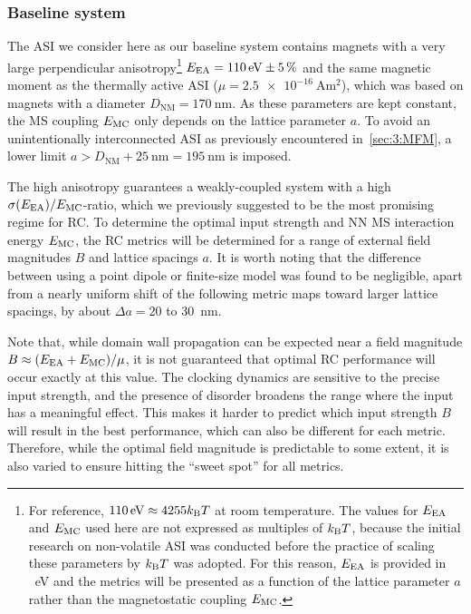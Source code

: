 \subsubsection{Baseline system}
The ASI we consider here as our baseline system contains magnets with a very large perpendicular anisotropy\footnote{
	For reference, $\SI{110}{\electronvolt} \approx 4255\kBT$ at room temperature.
	The values for $E_\mathrm{EA}$ and $E_\mathrm{MC}$ used here are not expressed as multiples of $\kBT$, because the initial research on non-volatile ASI was conducted before the practice of scaling these parameters by $\kBT$ was adopted.
	For this reason, $E_\mathrm{EA}$ is provided in \SI{}{\electronvolt} and the metrics will be presented as a function of the lattice parameter $a$ rather than the magnetostatic coupling $E_\mathrm{MC}$.
} $E_\mathrm{EA} = \SI{110}{\electronvolt} \pm \SI{5}{\percent}$ and the same magnetic moment as the thermally active ASI ($\mu = \SI{2.5e-16}{\ampere\metre\squared}$), which was based on magnets with a diameter $D_\mathrm{NM} = \SI{170}{\nano\metre}$.
As these parameters are kept constant, the MS coupling $E_\mathrm{MC}$ only depends on the lattice parameter $a$.
To avoid an unintentionally interconnected ASI as previously encountered in~\cref{sec:3:MFM}, a lower limit $a > D_\mathrm{NM} + \SI{25}{\nano\metre} = \SI{195}{\nano\metre}$ is imposed. \par
The high anisotropy guarantees a weakly-coupled system with a high $\sigma(E_\mathrm{EA})/E_\mathrm{MC}$-ratio, which we previously suggested to be the most promising regime for RC.
To determine the optimal input strength and NN MS interaction energy $E_\mathrm{MC}$, the RC metrics will be determined for a range of external field magnitudes $B$ and lattice spacings $a$.
It is worth noting that the difference between using a point dipole or finite-size model was found to be negligible, apart from a nearly uniform shift of the following metric maps toward larger lattice spacings, by about $\Delta a = 20$ to \SI{30}{\nano\metre}. \par %
Note that, while domain wall propagation can be expected near a field magnitude $B \approx (E_\mathrm{EA} + E_\mathrm{MC})/\mu$, it is not guaranteed that optimal RC performance will occur exactly at this value.
The clocking dynamics are sensitive to the precise input strength, and the presence of disorder broadens the range where the input has a meaningful effect.
This makes it harder to predict which input strength $B$ will result in the best performance, which can also be different for each metric.
Therefore, while the optimal field magnitude is predictable to some extent, it is also varied to ensure hitting the ``sweet spot'' for all metrics.

